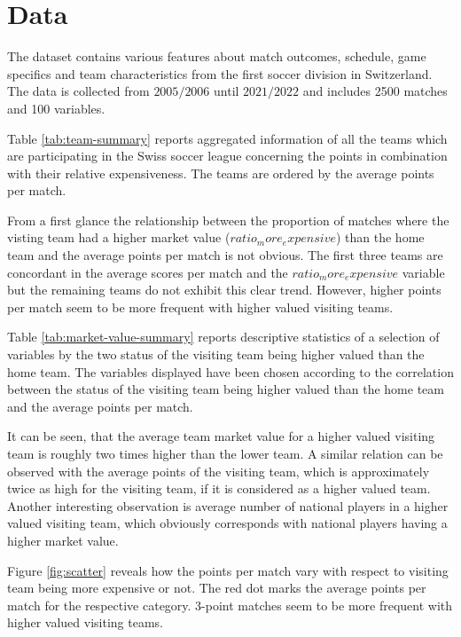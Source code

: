 \section{Data}
The dataset contains various features about match outcomes, schedule, game specifics and team characteristics from the
first soccer division in Switzerland. The data is collected from $2005/2006$ until $2021/2022$ and includes 2500
matches and 100 variables.

Table \ref{tab:team-summary} reports aggregated information of all the teams which are participating in the Swiss soccer
league concerning the points in combination with their relative expensiveness. The teams are ordered by the average points
per match.

From a first glance the relationship between the proportion of matches where the visting team had a higher market value ($ratio_more_expensive$)
than the home team and the average points per match is not obvious. The first three teams are concordant in the average
scores per match and the $ratio_more_expensive$ variable but the remaining teams do not exhibit this clear trend. However,
higher points per match seem to be more frequent with higher valued visiting teams.

Table \ref{tab:market-value-summary} reports descriptive statistics of a selection of variables by the two status of
the visiting team being higher valued than the home team. The variables displayed have been chosen according to the
correlation between the status of the visiting team being higher valued than the home team and the average points per match.

It can be seen, that the average team market value for a higher valued visiting team is roughly two times higher than
the lower team. A similar relation can be observed with the average points of the visiting team, which is approximately
twice as high for the visiting team, if it is considered as a higher valued team.
Another interesting observation is average number of national players in a higher valued visiting team, which obviously
corresponds with national players having a higher market value.

Figure \ref{fig:scatter} reveals how the points per match vary with respect to visiting team being more expensive or not.
The red dot marks the average points per match for the respective category. 3-point matches seem to be more frequent
with higher valued visiting teams.




